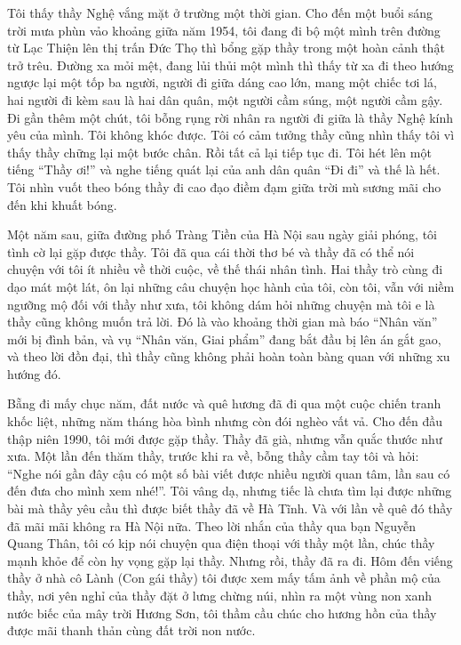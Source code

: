 Tôi thấy thầy Nghệ vắng mặt ở trường một thời gian. Cho đến một buổi sáng trời mưa phùn vảo khoảng giữa năm 1954, tôi đang đi bộ một mình trên đường từ Lạc Thiện lên thị trấn Đức Thọ thì bổng gặp thầy trong một hoàn cảnh thật trở trêu. Đường xa mỏi mệt, đang lủi thủi một mình thì thấy từ xa đi theo hướng ngược lại một tốp ba người, người đi giữa dáng cao lớn, mang một chiếc tơi lá, hai người đi kèm sau là hai dân quân, một người cầm súng, một người cầm gậy. Đi gần thêm một chút, tôi bỗng rụng rời nhân ra người đi giữa là thầy Nghệ kính yêu của mình. Tôi không khóc được. Tôi có cảm tưởng thầy cũng nhìn thấy tôi vì thấy thầy chững lại một bước chân. Rồi tất cả lại tiếp tục đi. Tôi hét lên một tiếng “Thầy ơi!” và nghe tiếng quát lại của anh dân quân “Đi đi” và thế là hết. Tôi nhìn vuốt theo bóng thầy đi cao đạo điềm đạm giữa trời mù sương mãi cho đến khi khuất bóng.

Một năm sau, giữa đường phố Tràng Tiền của Hà Nội sau ngày giải phóng, tôi tình cờ lại gặp được thầy. Tôi đã qua cái thời thơ bé và thầy đã có thể nói chuyện với tôi ít nhiều về thời cuộc, về thế thái nhân tình. Hai thầy trò cùng đi dạo mát một lát, ôn lại những câu chuyện học hành của tôi, còn tôi, vẫn với niềm ngưỡng mộ đối với thầy như xưa, tôi không dám hỏi những chuyện mà tôi e là thầy cũng không muốn trả lời. Đó là vào khoảng thời gian mà báo “Nhân văn” mới bị đình bản, và vụ “Nhân văn, Giai phẩm” đang bắt đầu bị lên án gắt gao, và theo lời đồn đại, thì thầy cũng không phải hoàn toàn bàng quan với những xu hướng đó.

Bẵng đi mấy chục năm, đất nước và quê hương đã đi qua một cuộc chiến tranh khốc liệt, những năm tháng hòa bình nhưng còn đói nghèo vất vả. Cho đến đầu thập niên 1990, tôi mới được gặp thầy. Thầy đã già, nhưng vẫn quắc thước như xưa. Một lần đến thăm thầy, trước khi ra về, bỗng thầy cầm tay tôi và hỏi: “Nghe nói gần đây cậu có một số bài viết được nhiều người quan tâm, lần sau có đến đưa cho mình xem nhé!”. Tôi vâng dạ, nhưng tiếc là chưa tìm lại được những bài mà thầy yêu cầu thì được biết thầy đã về Hà Tĩnh. Và với lần về quê đó thầy đã mãi mãi không ra Hà Nội nữa. Theo lời nhắn của thầy qua bạn Nguyễn Quang Thân, tôi có kịp nói chuyện qua điện thoại với thầy một lần, chúc thầy mạnh khỏe để còn hy vọng gặp lại thầy. Nhưng rồi, thầy đã ra đi. Hôm đến viếng thầy ở nhà cô Lành (Con gái thầy) tôi được xem mấy tấm ảnh về phần mộ của thầy, nơi yên nghỉ của thầy đặt ở lưng chừng núi, nhìn ra một vùng non xanh nước biếc của mây trời Hương Sơn, tôi thầm cầu chúc cho hương hồn của thầy được mãi thanh thản cùng đất trời non nước. 

